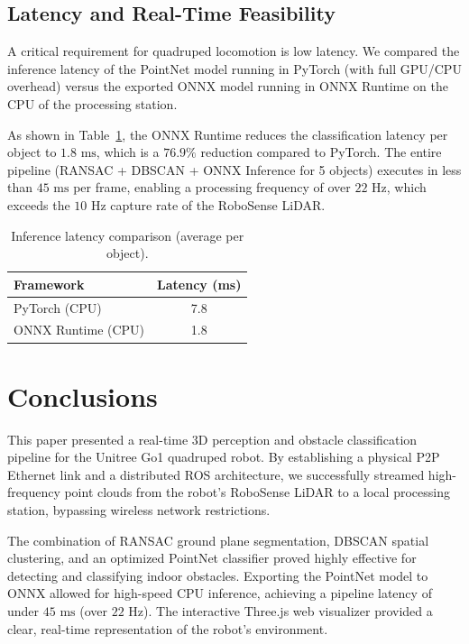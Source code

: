 \documentclass[a4paper,twocolumn]{article}
\begin{document}
\subsection{Latency and Real-Time Feasibility}
A critical requirement for quadruped locomotion is low latency. We compared the inference latency of the PointNet model running in PyTorch (with full GPU/CPU overhead) versus the exported ONNX model running in ONNX Runtime on the CPU of the processing station.

As shown in Table~\ref{tab:latency}, the ONNX Runtime reduces the classification latency per object to $1.8\text{ ms}$, which is a $76.9\%$ reduction compared to PyTorch. The entire pipeline (RANSAC + DBSCAN + ONNX Inference for 5 objects) executes in less than $45\text{ ms}$ per frame, enabling a processing frequency of over $22\text{ Hz}$, which exceeds the $10\text{ Hz}$ capture rate of the RoboSense LiDAR.

\begin{table}[!ht]
\centering\small
\caption{Inference latency comparison (average per object).}\label{tab:latency}
\begin{tabular}{lc}
\toprule
Framework & Latency (ms) \\
\midrule
PyTorch (CPU) & 7.8 \\
ONNX Runtime (CPU) & 1.8 \\
\bottomrule
\end{tabular}
\end{table}

\section{Conclusions}
This paper presented a real-time 3D perception and obstacle classification pipeline for the Unitree Go1 quadruped robot. By establishing a physical P2P Ethernet link and a distributed ROS architecture, we successfully streamed high-frequency point clouds from the robot's RoboSense LiDAR to a local processing station, bypassing wireless network restrictions.

The combination of RANSAC ground plane segmentation, DBSCAN spatial clustering, and an optimized PointNet classifier proved highly effective for detecting and classifying indoor obstacles. Exporting the PointNet model to ONNX allowed for high-speed CPU inference, achieving a pipeline latency of under $45\text{ ms}$ (over $22\text{ Hz}$). The interactive Three.js web visualizer provided a clear, real-time representation of the robot's environment.
\end{document}
